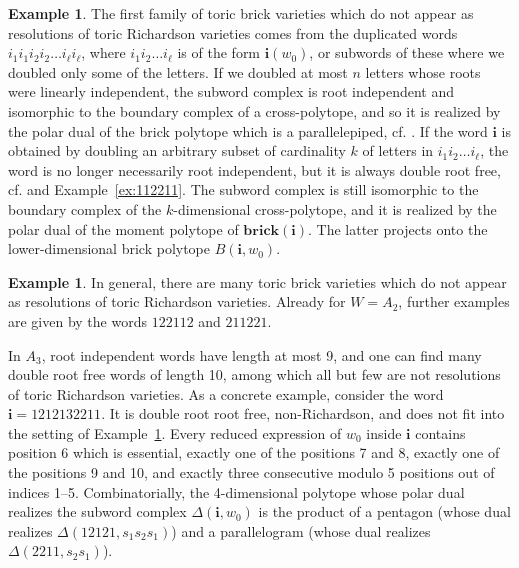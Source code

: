 \documentclass[a4paper, 11pt]{amsart}
\newcommand{\brick}{\mathbf{brick}}
\newcommand{\word}[1]{\mathbf{#1}}
\theoremstyle{definition}
\newtheorem{example}[theorem]{Example}
\begin{document}
\begin{example}
\label{ex:duplicated}
The first family of toric brick varieties which do not appear as resolutions of toric Richardson varieties comes from the duplicated words $i_1 i_1 i_2 i_2 \ldots i_\ell i_\ell$, where $i_1 i_2 \ldots i_\ell$ is of the form $\word{i}(w_0)$, or subwords of these where we doubled only some of the letters. If we doubled at most $n$ letters whose roots were linearly independent, the subword complex is root independent and isomorphic to the boundary complex of a cross-polytope, and so it is realized by the polar dual of the brick polytope which is a parallelepiped, cf. \cite[Example 3.9, Example 4.3]{pilaud_stump_15}. If the word $\word{i}$ is obtained by doubling an arbitrary subset of cardinality $k$ of letters in $i_1 i_2 \ldots i_\ell$, the word is no longer necessarily root independent, but it is always double root free, cf. \cite[Section 5.2.2]{PilaudStump-EL} and Example~\ref{ex:112211}. The subword complex is still isomorphic to the boundary complex of the $k$-dimensional cross-polytope, and it is realized by the polar dual of the moment polytope of $\brick(\word{i})$. The latter projects onto the lower-dimensional brick polytope $B(\word{i},w_0)$. 
\end{example}



\begin{example}
In general, there are many toric brick varieties which do not appear as resolutions of toric Richardson varieties. Already for $W = A_2$, further examples are given by the words $122112$ and $211221$. 


In $A_3$, root independent words have length at most 9, and one can find many double root free words of length 10, among which all but few are not resolutions of toric Richardson varieties. As a concrete example, consider the word $\word{i} = 1212132211$. It is double root root free, non-Richardson, and does not fit into the setting of Example~\ref{ex:duplicated}. Every reduced expression of $w_0$ inside $\word{i}$ contains position 6 which is essential, 
exactly one of the positions 7 and 8, exactly one of the positions 9 and 10, and exactly three consecutive modulo 5 positions out of indices 1--5. Combinatorially, the 4-dimensional polytope whose polar dual realizes the subword complex $\Delta(\word{i}, w_0)$ is the product of a pentagon (whose dual realizes $\Delta(12121, s_1s_2s_1)$) and a parallelogram (whose dual realizes $\Delta(2211, s_2s_1)$).
\end{example}
\end{document}
